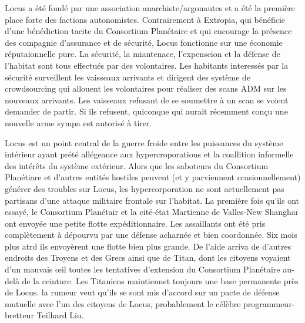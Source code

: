 Locus a été fondé par une association anarchiste/argonautes et a été la première place forte des factions autonomistes. Contrairement à Extropia, qui bénéficie d'une bénédiction tacite du Consortium Planétaire et qui encourage la présence des compagnie d'assurance et de sécurité, Locus fonctionne sur une économie réputaionnelle pure. La sécurité, la miantenace, l'expenseion et la défense de l'habitat sont tous effectués par des volontaires. Les habitants interessés par la sécurité surveillent les vaisseaux arrivants et dirigent des système de crowdsourcing qui allouent les volontaires pour réaliser des scans ADM sur les nouveaux arrivants. Les vaisseaux refusant de se soumettre à un scan se voient demander de partir. Si ils refusent, quiconque qui aurait récemment conçu une nouvelle arme sympa est autorisé à tirer. 

Locus est un point central de la guerre froide entre les puissances du système intérieur ayant prété allégeance aux hypercroporations et la coallition informelle des intérêts du système extérieur. Alors que les saboteurs du Consortium Planétiare et d'autres entités hostiles peuvent (et y parviennent ccasionnellement) générer des troubles sur Locus, les hypercorporation ne sont actuellement pas partisans d'une attaque militaire frontale sur l'habitat. La première fois qu'ils ont essayé, le Consortium Planétair et la cité-état Martienne de Valles-New Shanghaï ont envoyée une petite flotte expéditionnaire. Les assaillants ont été pris complètement à dépourvu par une défense acharnée et bien coordonnée. Six mois plus atrd ils envoyèrent une flotte bien plus grande. De l'aide arriva de d'autres endroits des Troyens et des Grecs ainsi que de Titan, dont les citoyens voyaient d'un mauvais œil toutes les tentatives d'extension du Consortium Planétaire au-delà de la ceinture. Les Titaniens maintiennet toujours une base permanente près de Locus. la rumeur veut qu'ils se sont mis d'accord sur un pacte de défense mutuelle avec l'un des citoyens de Locus, probablement le célèbre programmeur-bretteur Teilhard Liu. 

